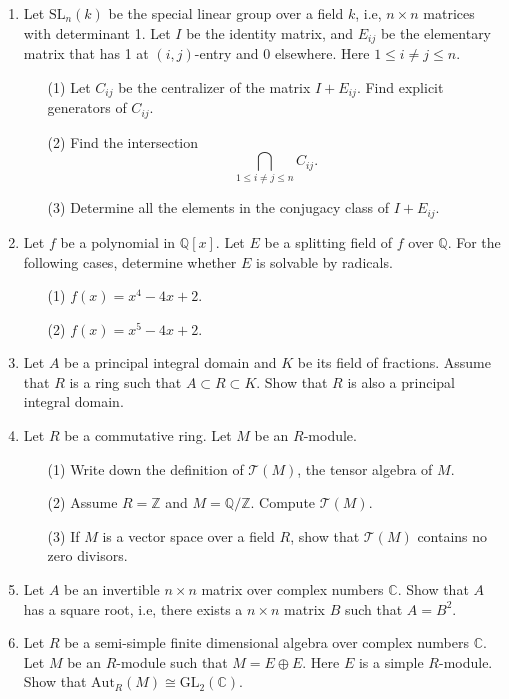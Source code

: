 \documentclass{article}
\begin{document}
\begin{enumerate}
    \item Let \(\text{SL}_n(k)\) be the special linear group over a field \(k\), i.e, \(n \times n\) matrices with determinant 1. Let \(I\) be the identity matrix, and \(E_{ij}\) be the elementary matrix that has 1 at \((i,j)\)-entry and 0 elsewhere. Here \(1 \leq i \neq j \leq n\).
    \begin{itemize}
        \item[(1)] Let \(C_{ij}\) be the centralizer of the matrix \(I + E_{ij}\). Find explicit generators of \(C_{ij}\).
        \item[(2)] Find the intersection
        \[\bigcap_{1 \leq i \neq j \leq n} C_{ij}.\]
        \item[(3)] Determine all the elements in the conjugacy class of \(I + E_{ij}\).
    \end{itemize}

    \item Let \(f\) be a polynomial in \(\mathbb{Q}[x]\). Let \(E\) be a splitting field of \(f\) over \(\mathbb{Q}\). For the following cases, determine whether \(E\) is solvable by radicals.
    \begin{itemize}
        \item[(1)] \(f(x) = x^4 - 4x + 2\).
        \item[(2)] \(f(x) = x^5 - 4x + 2\).
    \end{itemize}

    \item Let \(A\) be a principal integral domain and \(K\) be its field of fractions. Assume that \(R\) is a ring such that \(A \subset R \subset K\). Show that \(R\) is also a principal integral domain.

    \item Let \(R\) be a commutative ring. Let \(M\) be an \(R\)-module.
    \begin{itemize}
        \item[(1)] Write down the definition of \(\mathcal{T}(M)\), the tensor algebra of \(M\).
        \item[(2)] Assume \(R = \mathbb{Z}\) and \(M = \mathbb{Q}/\mathbb{Z}\). Compute \(\mathcal{T}(M)\).
        \item[(3)] If \(M\) is a vector space over a field \(R\), show that \(\mathcal{T}(M)\) contains no zero divisors.
    \end{itemize}

    \item Let \(A\) be an invertible \(n \times n\) matrix over complex numbers \(\mathbb{C}\). Show that \(A\) has a square root, i.e, there exists a \(n \times n\) matrix \(B\) such that \(A = B^2\).

    \item Let \(R\) be a semi-simple finite dimensional algebra over complex numbers \(\mathbb{C}\). Let \(M\) be an \(R\)-module such that \(M = E \oplus E\). Here \(E\) is a simple \(R\)-module. Show that \(\text{Aut}_R(M) \cong \text{GL}_2(\mathbb{C})\).
\end{enumerate}
\end{document}
